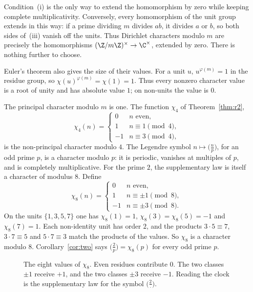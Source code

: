 Condition~(i) is the only way to extend the homomorphism by zero while keeping complete multiplicativity. Conversely, every homomorphism of the unit group extends in this way: if a prime dividing $m$ divides $ab$, it divides $a$ or $b$, so both sides of~(iii) vanish off the units. Thus Dirichlet characters modulo $m$ are precisely the homomorphisms $(\Z/m\Z)^\times\to\C^\times$, extended by zero. There is nothing further to choose.

Euler's theorem also gives the size of their values. For a unit $u$,
$u^{\varphi(m)}=1$ in the residue group, so
$\chi(u)^{\varphi(m)}=\chi(1)=1$. Thus every nonzero character value is a root of unity and has absolute value $1$; on non-units the value is $0$.

\begin{examplex}
The principal character modulo $m$ is one. The function $\chi_4$ of Theorem~\ref{thm:r2},
\[
\chi_4(n)=\begin{cases}
0&n\text{ even},\\
1&n\equiv1\pmod4,\\
-1&n\equiv3\pmod4,
\end{cases}
\]
is the non-principal character modulo $4$. The Legendre symbol $n\mapsto\bigl(\frac np\bigr)$, for an odd prime $p$, is a character modulo $p$: it is periodic, vanishes at multiples of $p$, and is completely multiplicative. For the prime $2$, the supplementary law is itself a character of modulus $8$. Define
\[
\chi_8(n)=\begin{cases}
0&n\text{ even},\\
1&n\equiv\pm1\pmod8,\\
-1&n\equiv\pm3\pmod8.
\end{cases}
\]
On the units $\{1,3,5,7\}$ one has $\chi_8(1)=1$, $\chi_8(3)=\chi_8(5)=-1$ and $\chi_8(7)=1$. Each non-identity unit has order $2$, and the products $3\cdot5\equiv7$, $3\cdot7\equiv5$ and $5\cdot7\equiv3$ match the products of the values. So $\chi_8$ is a character modulo $8$. Corollary~\ref{cor:two} says $\bigl(\frac2p\bigr)=\chi_8(p)$ for every odd prime $p$.
\end{examplex}

\begin{figure}[ht]
\centering
{}
\caption{The eight values of $\chi_8$. Even residues contribute $0$. The two classes $\pm1$ receive $+1$, and the two classes $\pm3$ receive $-1$. Reading the clock is the supplementary law for the symbol $\bigl(\frac2{\cdot}\bigr)$.}
\label{fig:t1-chi8}
\end{figure}

